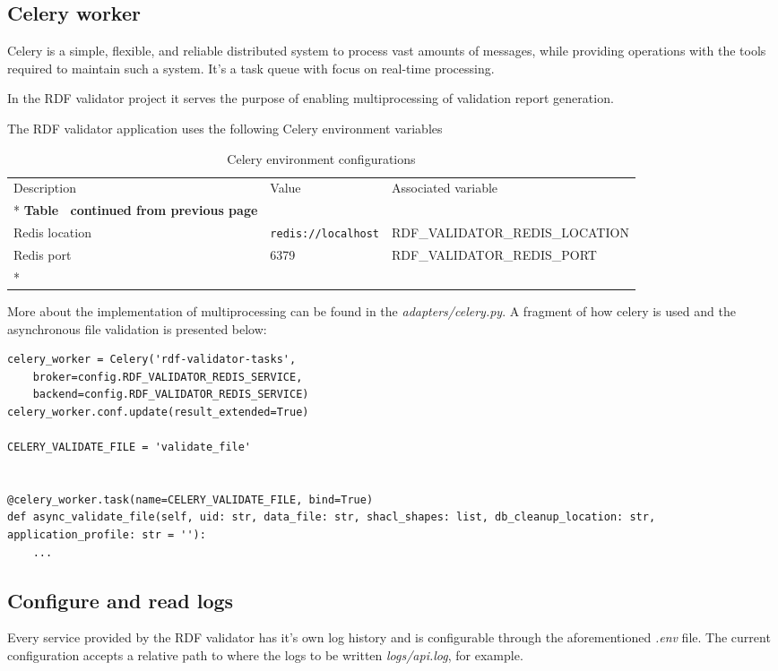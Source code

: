 \subsection{Celery worker}
Celery is a simple, flexible, and reliable distributed system to process vast amounts of messages, while providing operations with the tools required to maintain such a system. It’s a task queue with focus on real-time processing.

In the RDF validator project it serves the purpose of enabling multiprocessing of validation report generation.

The RDF validator application uses the following Celery environment variables

\begin{longtable}[c]{@{}p{3.5cm}p{3.5cm}l@{}}
	\toprule
	Description    & Value                      & Associated variable             \\* \midrule
	\endfirsthead
	\multicolumn{3}{c}%
	{{\bfseries Table \thetable\ continued from previous page}}                   \\
	\endhead
	\bottomrule
	\endfoot
	\endlastfoot
	Redis location & \texttt{redis://localhost} & RDF\_VALIDATOR\_REDIS\_LOCATION \\
	Redis port     & 6379                       & RDF\_VALIDATOR\_REDIS\_PORT     \\*\bottomrule
	\caption{Celery environment configurations}
	\label{tab:validator-celery-env}                                              \\
\end{longtable}

More about the implementation of multiprocessing can be found in the \textit{adapters/celery.py}. A fragment of how celery is used and the asynchronous file validation is presented below:

\begin{lstlisting}
celery_worker = Celery('rdf-validator-tasks',
	broker=config.RDF_VALIDATOR_REDIS_SERVICE,
	backend=config.RDF_VALIDATOR_REDIS_SERVICE)
celery_worker.conf.update(result_extended=True)

CELERY_VALIDATE_FILE = 'validate_file'


@celery_worker.task(name=CELERY_VALIDATE_FILE, bind=True)
def async_validate_file(self, uid: str, data_file: str, shacl_shapes: list, db_cleanup_location: str, application_profile: str = ''):
	...
\end{lstlisting}

\subsection{Configure and read logs}
Every service provided by the RDF validator has it's own log history and is configurable through the aforementioned \textit{.env} file. The current configuration accepts a relative path to where the logs to be written \textit{logs/api.log}, for example.

